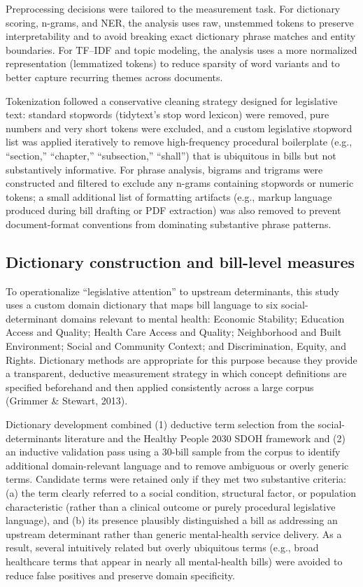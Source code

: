 \documentclass[10pt,twocolumn]{article}
\begin{document}
Preprocessing decisions were tailored to the measurement task. For
dictionary scoring, n-grams, and NER, the analysis uses raw, unstemmed
tokens to preserve interpretability and to avoid breaking exact
dictionary phrase matches and entity boundaries. For TF--IDF and topic
modeling, the analysis uses a more normalized representation (lemmatized
tokens) to reduce sparsity of word variants and to better capture
recurring themes across documents.

Tokenization followed a conservative cleaning strategy designed for
legislative text: standard stopwords (tidytext's stop word lexicon) were
removed, pure numbers and very short tokens were excluded, and a custom
legislative stopword list was applied iteratively to remove
high-frequency procedural boilerplate (e.g., ``section,'' ``chapter,''
``subsection,'' ``shall'') that is ubiquitous in bills but not
substantively informative. For phrase analysis, bigrams and trigrams
were constructed and filtered to exclude any n-grams containing
stopwords or numeric tokens; a small additional list of formatting
artifacts (e.g., markup language produced during bill drafting or PDF
extraction) was also removed to prevent document-format conventions from
dominating substantive phrase patterns.

\subsection{Dictionary construction and bill-level
measures}\label{dictionary-construction-and-bill-level-measures}

To operationalize ``legislative attention'' to upstream determinants,
this study uses a custom domain dictionary that maps bill language to
six social-determinant domains relevant to mental health: Economic
Stability; Education Access and Quality; Health Care Access and Quality;
Neighborhood and Built Environment; Social and Community Context; and
Discrimination, Equity, and Rights. Dictionary methods are appropriate
for this purpose because they provide a transparent, deductive
measurement strategy in which concept definitions are specified
beforehand and then applied consistently across a large corpus (Grimmer
\& Stewart, 2013).

Dictionary development combined (1) deductive term selection from the
social-determinants literature and the Healthy People 2030 SDOH
framework and (2) an inductive validation pass using a 30-bill sample
from the corpus to identify additional domain-relevant language and to
remove ambiguous or overly generic terms. Candidate terms were retained
only if they met two substantive criteria: (a) the term clearly referred
to a social condition, structural factor, or population characteristic
(rather than a clinical outcome or purely procedural legislative
language), and (b) its presence plausibly distinguished a bill as
addressing an upstream determinant rather than generic mental-health
service delivery. As a result, several intuitively related but overly
ubiquitous terms (e.g., broad healthcare terms that appear in nearly all
mental-health bills) were avoided to reduce false positives and preserve
domain specificity.
\end{document}
